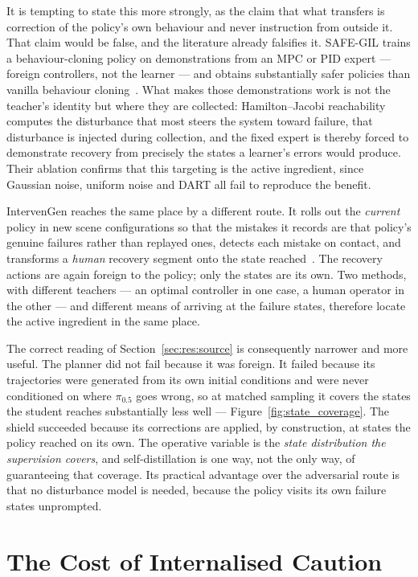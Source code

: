 It is tempting to state this more strongly, as the claim that what transfers is correction of the
policy's own behaviour and never instruction from outside it. That claim would be false, and the
literature already falsifies it. SAFE-GIL trains a behaviour-cloning policy on demonstrations from
an MPC or PID expert --- foreign controllers, not the learner --- and obtains substantially safer
policies than vanilla behaviour cloning~\cite{ciftci2025safegil}. What makes those demonstrations
work is not the teacher's identity but where they are collected: Hamilton--Jacobi reachability
computes the disturbance that most steers the system toward failure, that disturbance is injected
during collection, and the fixed expert is thereby forced to demonstrate recovery from precisely
the states a learner's errors would produce. Their ablation confirms that this targeting is the
active ingredient, since Gaussian noise, uniform noise and DART all fail to reproduce the benefit.

IntervenGen reaches the same place by a different route. It rolls out the \emph{current} policy in
new scene configurations so that the mistakes it records are that policy's genuine failures rather
than replayed ones, detects each mistake on contact, and transforms a \emph{human} recovery segment
onto the state reached~\cite{hoque2024intervengen}. The recovery actions are again foreign to the
policy; only the states are its own. Two methods, with different teachers --- an optimal controller
in one case, a human operator in the other --- and different means of arriving at the failure
states, therefore locate the active ingredient in the same place.

The correct reading of Section~\ref{sec:res:source} is consequently narrower and more useful. The
planner did not fail because it was foreign. It failed because its trajectories were generated from
its own initial conditions and were never conditioned on where $\pi_{0.5}$ goes wrong, so at
matched sampling it covers the states the student reaches substantially less well ---
Figure~\ref{fig:state_coverage}. The shield succeeded because its corrections are applied, by
construction, at states the policy reached on its own. The operative variable is the \emph{state
distribution the supervision covers}, and self-distillation is one way, not the only way, of
guaranteeing that coverage. Its practical advantage over the adversarial route is that no
disturbance model is needed, because the policy visits its own failure states unprompted.

\section{The Cost of Internalised Caution}\label{sec:disc:cost}

